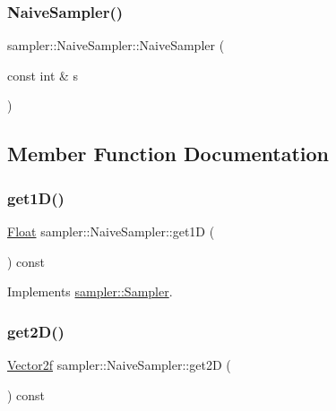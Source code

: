 \subsubsection{\texorpdfstring{NaiveSampler()}{NaiveSampler()}}
{\footnotesize\ttfamily sampler\+::\+Naive\+Sampler\+::\+Naive\+Sampler (\begin{DoxyParamCaption}\item[{const int \&}]{s }\end{DoxyParamCaption})}



\subsection{Member Function Documentation}
\mbox{\label{classsampler_1_1NaiveSampler_ad1d445bae1088385deaa5ec05ce7e46a}} 
\subsubsection{\texorpdfstring{get1D()}{get1D()}}
{\footnotesize\ttfamily \mbox{\hyperlink{cyclop_8hpp_a07afd7094cb489cbd514c76e6f55d34f}{Float}} sampler\+::\+Naive\+Sampler\+::get1D (\begin{DoxyParamCaption}{ }\end{DoxyParamCaption}) const\hspace{0.3cm}{\ttfamily [virtual]}}



Implements \mbox{\hyperlink{classsampler_1_1Sampler_a1bf2e7752ddd5b44fd291c04ffad3464}{sampler\+::\+Sampler}}.

\mbox{\label{classsampler_1_1NaiveSampler_a77655f0c205ae4680e58744850746f06}} 
\subsubsection{\texorpdfstring{get2D()}{get2D()}}
{\footnotesize\ttfamily \mbox{\hyperlink{cyclop_8hpp_a0c5eff6545fe0b71d0592c88d930b697}{Vector2f}} sampler\+::\+Naive\+Sampler\+::get2D (\begin{DoxyParamCaption}{ }\end{DoxyParamCaption}) const\hspace{0.3cm}{\ttfamily [virtual]}}



